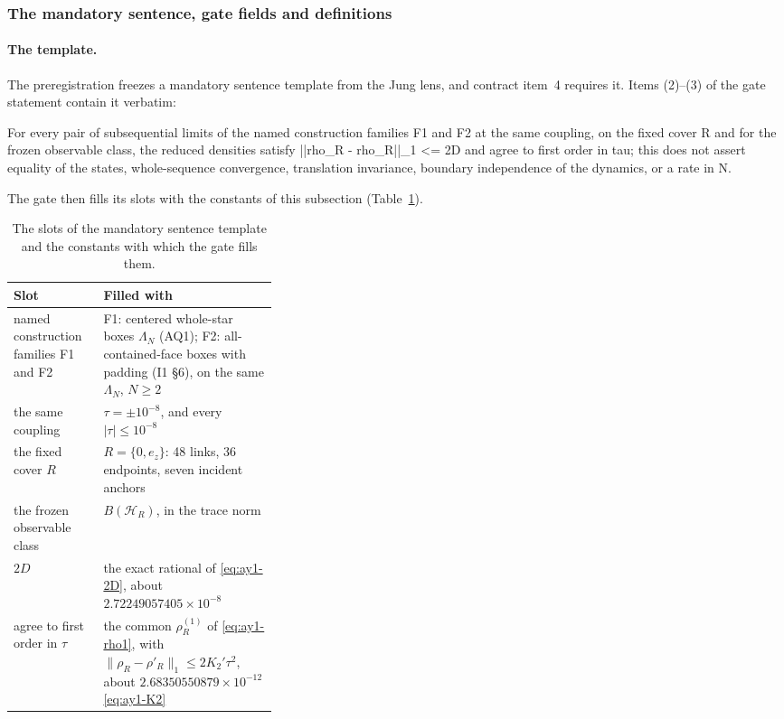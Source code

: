 \subsubsection{The mandatory sentence, gate fields and definitions}
\label{sec:ay1-sentence}
\paragraph{The template.}
The preregistration freezes a mandatory sentence template from the Jung lens,
and contract item~4 requires it. Items (2)--(3) of the gate statement contain
it verbatim:
\begin{gatequote}
For every pair of subsequential limits of the named construction families F1
and F2 at the same coupling, on the fixed cover R and for the frozen
observable class, the reduced densities satisfy ||rho\_R -
rho\textquotesingle{}\_R||\_1 <= 2D and agree to first order in tau; this does
not assert equality of the states, whole-sequence convergence, translation
invariance, boundary independence of the dynamics, or a rate in N.
\end{gatequote}
The gate then fills its slots with the constants of this subsection
(Table~\ref{tab:ay1-template}).

\begin{table}[htbp]
\centering\small
\caption{The slots of the mandatory sentence template and the constants with
which the gate fills them.}
\label{tab:ay1-template}
\begin{tabularx}{\linewidth}{@{}>{\raggedright\arraybackslash}p{0.34\linewidth}
 >{\raggedright\arraybackslash}X@{}}
\toprule
Slot & Filled with\\
\midrule
named construction families F1 and F2 & F1: centered whole-star boxes
$\Lambda_N$ (AQ1); F2: all-contained-face boxes with padding (I1 \S6), on the
same $\Lambda_N$, $N\ge2$\\
the same coupling & $\tau=\pm10^{-8}$, and every $|\tau|\le10^{-8}$\\
the fixed cover $R$ & $R=\{0,e_z\}$: 48 links, 36 endpoints, seven incident
anchors\\
the frozen observable class & $B(\mathcal H_R)$, in the trace norm\\
$2D$ & the exact rational of \eqref{eq:ay1-2D}, about
$2.72249057405\times10^{-8}$\\
agree to first order in $\tau$ & the common $\rho^{(1)}_R$ of
\eqref{eq:ay1-rho1}, with $\lVert \rho_R-\rho'_R\rVert_1\le2K_2'\tau^2$, about
$2.68350550879\times10^{-12}$ \eqref{eq:ay1-K2}\\
\bottomrule
\end{tabularx}
\end{table}

